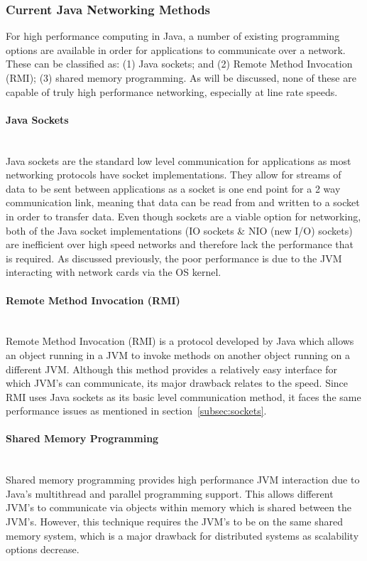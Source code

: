 \documentclass[final_report.tex]{subfiles}
\begin{document}
\subsubsection{Current Java Networking Methods}
For high performance computing in Java, a number of existing programming options are available in order for applications to communicate over a network. These can be classified as: (1) Java sockets; and (2) Remote Method Invocation (RMI); (3) shared memory programming. As will be discussed, none of these are capable of truly high performance networking, especially at line rate speeds.

\paragraph{Java Sockets}\mbox{}\\ %
\label{subsec:sockets}
Java sockets are the standard low level communication for applications as most networking protocols have socket implementations. They allow for streams of data to be sent between applications as a socket is one end point for a 2 way communication link, meaning that data can be read from and written to a socket in order to transfer data. Even though sockets are a viable option for networking, both of the Java socket implementations (IO sockets \& NIO (new I/O) sockets) are inefficient over high speed networks \cite{sockets} and therefore lack the performance that is required. As discussed previously, the poor performance is due to the JVM interacting with network cards via the OS kernel.

\paragraph{Remote Method Invocation (RMI)}\mbox{}\\ %
Remote Method Invocation (RMI) is a protocol developed by Java which allows an object running in a JVM to invoke methods on another object running on a different JVM. Although this method provides a relatively easy interface for which JVM's can communicate, its major drawback relates to the speed. Since RMI uses Java sockets as its basic level communication method, it faces the same performance issues as mentioned in section~\ref{subsec:sockets}.

\paragraph{Shared Memory Programming}\mbox{}\\ %
Shared memory programming provides high performance JVM interaction due to Java's multithread and parallel programming support. This allows different JVM's to communicate via objects within memory which is shared between the JVM's. However, this technique requires the JVM's to be on the same shared memory system, which is a major drawback for distributed systems as scalability options decrease.
\end{document}

